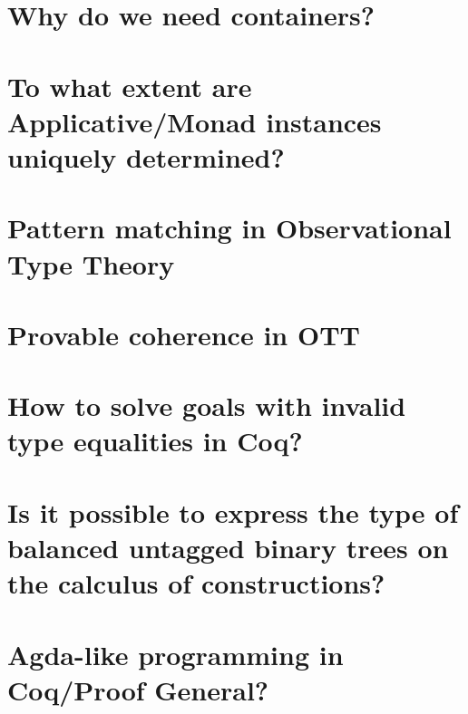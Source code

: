 \documentclass{book}
\begin{document}
\section{Why do we need containers?}


\section{To what extent are Applicative/Monad instances uniquely determined?}


\section{Pattern matching in Observational Type Theory}


\section{Provable coherence in OTT}


\section{How to solve goals with invalid type equalities in Coq?}


\section{Is it possible to express the type of balanced untagged binary trees on the calculus of constructions?}


\section{Agda-like programming in Coq/Proof General?}

\end{document}
